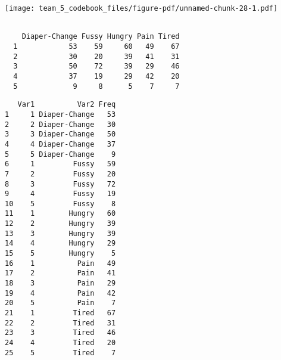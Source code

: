 \documentclass[
  letterpaper,
  DIV=11,
  numbers=noendperiod]{scrartcl}
\newenvironment{Shaded}{\begin{snugshade}}{\end{snugshade}}
\newcommand{\AttributeTok}[1]{\textcolor[rgb]{0.40,0.45,0.13}{#1}}
\newcommand{\CommentTok}[1]{\textcolor[rgb]{0.37,0.37,0.37}{#1}}
\newcommand{\DecValTok}[1]{\textcolor[rgb]{0.68,0.00,0.00}{#1}}
\newcommand{\FunctionTok}[1]{\textcolor[rgb]{0.28,0.35,0.67}{#1}}
\newcommand{\NormalTok}[1]{\textcolor[rgb]{0.00,0.23,0.31}{#1}}
\newcommand{\OtherTok}[1]{\textcolor[rgb]{0.00,0.23,0.31}{#1}}
\newcommand{\SpecialCharTok}[1]{\textcolor[rgb]{0.37,0.37,0.37}{#1}}
\begin{document}
\begin{center}
\texttt{[image: team\_5\_codebook\_files/figure-pdf/unnamed-chunk-28-1.pdf]}
\end{center}

\begin{Shaded}
\end{Shaded}

\begin{verbatim}
   
    Diaper-Change Fussy Hungry Pain Tired
  1            53    59     60   49    67
  2            30    20     39   41    31
  3            50    72     39   29    46
  4            37    19     29   42    20
  5             9     8      5    7     7
\end{verbatim}

\begin{Shaded}
\end{Shaded}

\begin{verbatim}
   Var1          Var2 Freq
1     1 Diaper-Change   53
2     2 Diaper-Change   30
3     3 Diaper-Change   50
4     4 Diaper-Change   37
5     5 Diaper-Change    9
6     1         Fussy   59
7     2         Fussy   20
8     3         Fussy   72
9     4         Fussy   19
10    5         Fussy    8
11    1        Hungry   60
12    2        Hungry   39
13    3        Hungry   39
14    4        Hungry   29
15    5        Hungry    5
16    1          Pain   49
17    2          Pain   41
18    3          Pain   29
19    4          Pain   42
20    5          Pain    7
21    1         Tired   67
22    2         Tired   31
23    3         Tired   46
24    4         Tired   20
25    5         Tired    7
\end{verbatim}

\begin{Shaded}
\end{Shaded}
\end{document}
